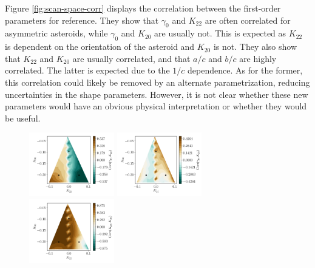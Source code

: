 \documentclass[fleqn,usenatbib]{mnras}
\begin{document}
Figure \ref{fig:scan-space-corr} displays the correlation between the first-order parameters for reference. They show that $\gamma_0$ and $K_{22}$ are often correlated for asymmetric asteroids, while $\gamma_0$ and $K_{20}$ are usually not. This is expected as $K_{22}$ is dependent on the orientation of the asteroid and $K_{20}$ is not. They also show that $K_{22}$ and $K_{20}$ are usually correlated, and that $a/c$ and $b/c$ are highly correlated. The latter is expected due to the $1/c$ dependence. As for the former, this correlation could likely be removed by an alternate parametrization, reducing uncertainties in the shape parameters. However, it is not clear whether these new parameters would have an obvious physical interpretation or whether they would be useful.

\begin{figure}
  \includegraphics[width=0.33\textwidth]{figs/probe-space-corr12.pdf}\hfill
  \includegraphics[width=0.33\textwidth]{figs/probe-space-corr13.pdf}\hfill
  \includegraphics[width=0.33\textwidth]{figs/probe-space-corr23.pdf}


\end{figure}
\end{document}
